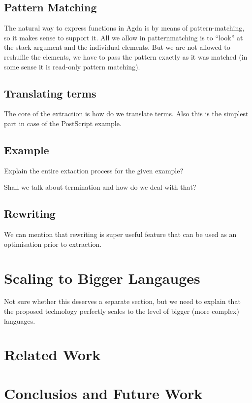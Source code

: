 \documentclass[sigplan,anonymous,review]{acmart}
\begin{document}
\subsection{Pattern Matching}
The natural way to express functions in Agda is by means of pattern-matching, so it makes sense
to support it.  All we allow in patternmatching is to ``look'' at the stack argument and the
individual elements.  But we are not allowed to reshuffle the elements, we have to pass the
pattern exactly as it was matched (in some sense it is read-only pattern matching).

\subsection{\label{sec:translating-terms}Translating terms}
The core of the extraction is how do we translate terms.  Also this is the simplest part in
case of the PostScript example.

\subsection{Example}
Explain the entire extaction process for the given example?

Shall we talk about termination and how do we deal with that?


\subsection{\label{sec:rewriting}Rewriting}
We can mention that rewriting is super useful feature that can be used as an optimisation
prior to extraction.



\section{Scaling to Bigger Langauges}
Not sure whether this deserves a separate section, but we need to explain
that the proposed technology perfectly scales to the level of bigger (more complex)
languages.


\section{Related Work}

\section{Conclusios and Future Work}


\end{document}
